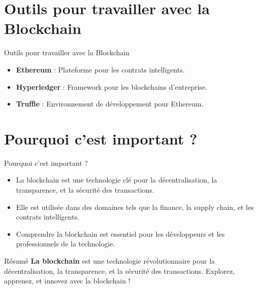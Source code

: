 \documentclass{clbeamer2024}
\begin{document}
\section{Outils pour travailler avec la Blockchain}
\begin{frame}{Outils pour travailler avec la Blockchain}
	\begin{itemize}
		\item \textbf{Ethereum} : Plateforme pour les contrats intelligents.
		\item \textbf{Hyperledger} : Framework pour les blockchains d'entreprise.
		\item \textbf{Truffle} : Environnement de développement pour Ethereum.
	\end{itemize}
\end{frame}


\section{Pourquoi c'est important ?}
\begin{frame}{Pourquoi c'est important ?}
	\begin{itemize}
		\item La blockchain est une technologie clé pour la décentralisation, la transparence, et la sécurité des transactions.
		\item Elle est utilisée dans des domaines tels que la finance, la supply chain, et les contrats intelligents.
		\item Comprendre la blockchain est essentiel pour les développeurs et les professionnels de la technologie.
	\end{itemize}
\end{frame}


\begin{frame}{Résumé}
	\textbf{La blockchain} est une technologie révolutionnaire pour la décentralisation, la transparence, et la sécurité des transactions.  
	Explorez, apprenez, et innovez avec la blockchain !
\end{frame}
	

	
	
\end{document}
